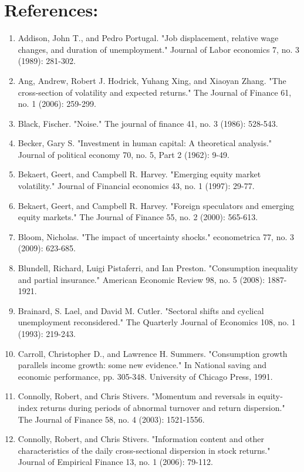 \documentclass[12pt]{article}
\begin{document}
\section{References:}
\begin{enumerate}

    \item{Addison, John T., and Pedro Portugal. "Job displacement, relative wage changes, and duration of unemployment." Journal of Labor economics 7, no. 3 (1989): 281-302.}
    \item{Ang, Andrew, Robert J. Hodrick, Yuhang Xing, and Xiaoyan Zhang. "The cross‐section of volatility and expected returns." The Journal of Finance 61, no. 1 (2006): 259-299.}
    \item{Black, Fischer. "Noise." The journal of finance 41, no. 3 (1986): 528-543.}
    \item{Becker, Gary S. "Investment in human capital: A theoretical analysis." Journal of political economy 70, no. 5, Part 2 (1962): 9-49.}
    \item{Bekaert, Geert, and Campbell R. Harvey. "Emerging equity market volatility." Journal of Financial economics 43, no. 1 (1997): 29-77.}
    \item{Bekaert, Geert, and Campbell R. Harvey. "Foreign speculators and emerging equity markets." The Journal of Finance 55, no. 2 (2000): 565-613.}
    \item{Bloom, Nicholas. "The impact of uncertainty shocks." econometrica 77, no. 3 (2009): 623-685.}
    \item{Blundell, Richard, Luigi Pistaferri, and Ian Preston. "Consumption inequality and partial insurance." American Economic Review 98, no. 5 (2008): 1887-1921.}
    \item{Brainard, S. Lael, and David M. Cutler. "Sectoral shifts and cyclical unemployment reconsidered." The Quarterly Journal of Economics 108, no. 1 (1993): 219-243.}
    \item{Carroll, Christopher D., and Lawrence H. Summers. "Consumption growth parallels income growth: some new evidence." In National saving and economic performance, pp. 305-348. University of Chicago Press, 1991.}
    \item{Connolly, Robert, and Chris Stivers. "Momentum and reversals in equity‐index returns during periods of abnormal turnover and return dispersion." The Journal of Finance 58, no. 4 (2003): 1521-1556.}
    \item{Connolly, Robert, and Chris Stivers. "Information content and other characteristics of the daily cross-sectional dispersion in stock returns." Journal of Empirical Finance 13, no. 1 (2006): 79-112.}

\end{enumerate}
\end{document}
